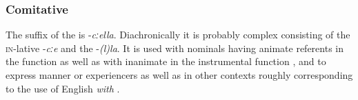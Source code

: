 \subsubsection{Comitative}
\label{sssec:Comitative}

The suffix of the  is -\textit{cːella}. Diachronically it is probably complex consisting of the \textsc{in}-lative -\textit{cːe} and the  -\textit{(l)la}. It is used with nominals having animate referents in the  function  as well as with inanimate  in the instrumental function ,  and to express manner  or experiencers  as well as in other contexts roughly corresponding to the use of English \textit{with} .
%
